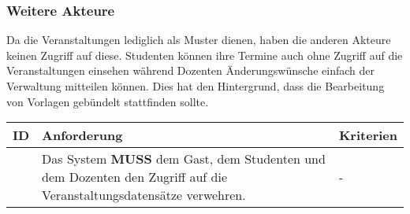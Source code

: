\newpage

\subsubsection{Weitere Akteure}
Da die Veranstaltungen lediglich als Muster dienen, haben die anderen Akteure keinen Zugriff auf diese. Studenten können ihre Termine auch ohne Zugriff auf die Veranstaltungen einsehen während Dozenten Änderungswünsche einfach der Verwaltung mitteilen können. Dies hat den Hintergrund, dass die Bearbeitung von Vorlagen gebündelt stattfinden sollte.

\vspace{12pt}

\begin{tabular} {|p{}|p{}|p{}|}
	\hline
	ID & Anforderung & Kriterien \\
	\hline
	\printfreqnr
	& Das System \textbf{MUSS} dem Gast, dem Studenten und dem Dozenten den Zugriff auf die Veranstaltungsdatensätze verwehren.
	& - \\
	\hline
\end{tabular}

\newpage
